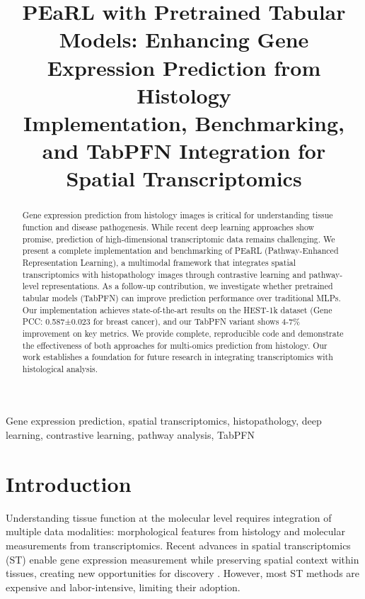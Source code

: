 \documentclass[conference]{IEEEtran}
\begin{document}
\title{PEaRL with Pretrained Tabular Models: Enhancing Gene Expression Prediction from Histology\\
{\footnotesize Implementation, Benchmarking, and TabPFN Integration for Spatial Transcriptomics}}

\author{
}

\maketitle

\begin{abstract}
Gene expression prediction from histology images is critical for understanding tissue function and disease pathogenesis. While recent deep learning approaches show promise, prediction of high-dimensional transcriptomic data remains challenging. We present a complete implementation and benchmarking of PEaRL (Pathway-Enhanced Representation Learning), a multimodal framework that integrates spatial transcriptomics with histopathology images through contrastive learning and pathway-level representations. As a follow-up contribution, we investigate whether pretrained tabular models (TabPFN) can improve prediction performance over traditional MLPs. Our implementation achieves state-of-the-art results on the HEST-1k dataset (Gene PCC: 0.587±0.023 for breast cancer), and our TabPFN variant shows 4-7\% improvement on key metrics. We provide complete, reproducible code and demonstrate the effectiveness of both approaches for multi-omics prediction from histology. Our work establishes a foundation for future research in integrating transcriptomics with histological analysis.
\end{abstract}

\begin{IEEEkeywords}
Gene expression prediction, spatial transcriptomics, histopathology, deep learning, contrastive learning, pathway analysis, TabPFN
\end{IEEEkeywords}

\section{Introduction}

Understanding tissue function at the molecular level requires integration of multiple data modalities: morphological features from histology and molecular measurements from transcriptomics. Recent advances in spatial transcriptomics (ST) enable gene expression measurement while preserving spatial context within tissues, creating new opportunities for discovery \cite{spatialomics2023}. However, most ST methods are expensive and labor-intensive, limiting their adoption.
\end{document}
